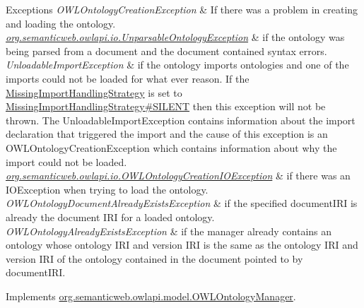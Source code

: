 \begin{DoxyExceptions}{Exceptions}
{\em O\-W\-L\-Ontology\-Creation\-Exception} & If there was a problem in creating and loading the ontology. \\
\hline
{\em \hyperlink{classorg_1_1semanticweb_1_1owlapi_1_1io_1_1_unparsable_ontology_exception}{org.\-semanticweb.\-owlapi.\-io.\-Unparsable\-Ontology\-Exception}} & if the ontology was being parsed from a document and the document contained syntax errors. \\
\hline
{\em Unloadable\-Import\-Exception} & if the ontology imports ontologies and one of the imports could not be loaded for what ever reason. If the \hyperlink{}{Missing\-Import\-Handling\-Strategy} is set to \hyperlink{enumorg_1_1semanticweb_1_1owlapi_1_1model_1_1_missing_import_handling_strategy_aed66060ec95dc4ad59ca4dd82509782b}{Missing\-Import\-Handling\-Strategy\#\-S\-I\-L\-E\-N\-T} then this exception will not be thrown. The {\ttfamily Unloadable\-Import\-Exception} contains information about the import declaration that triggered the import and the cause of this exception is an {\ttfamily O\-W\-L\-Ontology\-Creation\-Exception} which contains information about why the import could not be loaded. \\
\hline
{\em \hyperlink{classorg_1_1semanticweb_1_1owlapi_1_1io_1_1_o_w_l_ontology_creation_i_o_exception}{org.\-semanticweb.\-owlapi.\-io.\-O\-W\-L\-Ontology\-Creation\-I\-O\-Exception}} & if there was an {\ttfamily I\-O\-Exception} when trying to load the ontology. \\
\hline
{\em O\-W\-L\-Ontology\-Document\-Already\-Exists\-Exception} & if the specified {\ttfamily document\-I\-R\-I} is already the document I\-R\-I for a loaded ontology. \\
\hline
{\em O\-W\-L\-Ontology\-Already\-Exists\-Exception} & if the manager already contains an ontology whose ontology I\-R\-I and version I\-R\-I is the same as the ontology I\-R\-I and version I\-R\-I of the ontology contained in the document pointed to by {\ttfamily document\-I\-R\-I}. \\
\hline
\end{DoxyExceptions}


Implements \hyperlink{interfaceorg_1_1semanticweb_1_1owlapi_1_1model_1_1_o_w_l_ontology_manager_accbb42a9bb5bfc566e51fc81b0e7d386}{org.\-semanticweb.\-owlapi.\-model.\-O\-W\-L\-Ontology\-Manager}.


